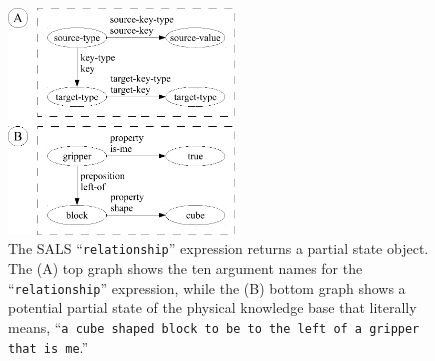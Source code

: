 \begin{figure}
\centering
\includegraphics[width=6cm]{gfx/relationship_partial_state_graph-handdrawn}
\caption[The SALS ``{\tt{relationship}}'' expression returns a partial
  state object.]{The SALS ``{\tt{relationship}}'' expression returns a
  partial state object.  The (A) top graph shows the ten argument
  names for the ``{\tt{relationship}}'' expression, while the (B)
  bottom graph shows a potential partial state of the physical
  knowledge base that literally means, ``{\tt{a cube shaped block to
      be to the left of a gripper that is me}}.''}
\label{figure:relationship_partial_state_graph}
\end{figure}

